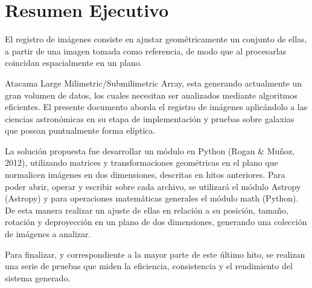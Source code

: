\section{Resumen Ejecutivo}

El registro de imágenes consiste en ajustar geométricamente un
conjunto de ellas, a partir de una imagen tomada como referencia, de
modo que al procesarlas coincidan espacialmente en un plano.

Atacama Large Milimetric/Submilimetric Array, esta generando actualmente un gran
volumen de datos, los cuales necesitan ser analizados mediante algoritmos
eficientes.
El presente documento aborda el registro de imágenes aplicándolo a las ciencias
astronómicas en su etapa de implementación y pruebas sobre galaxias que posean 
puntualmente forma elíptica.

La solución propuesta fue desarrollar un módulo en Python (Rogan \&
Muñoz, 2012), utilizando matrices y transformaciones geométricas en el
plano que normalicen imágenes en dos dimensiones, descritas en hitos anteriores. 
Para poder abrir, operar y escribir sobre cada archivo, se utilizará el módulo Astropy
(Astropy) y para operaciones matemáticas generales el módulo math
(Python). De esta manera realizar un ajuste de ellas en relación a su
posición, tamaño, rotación y deproyección en un plano de dos
dimensiones, generando una colección de imágenes a analizar.

Para finalizar, y correspondiente a la mayor parte de este último hito, 
se realizan una serie de pruebas que miden la eficiencia,
consistencia y el rendimiento del sistema generado.


